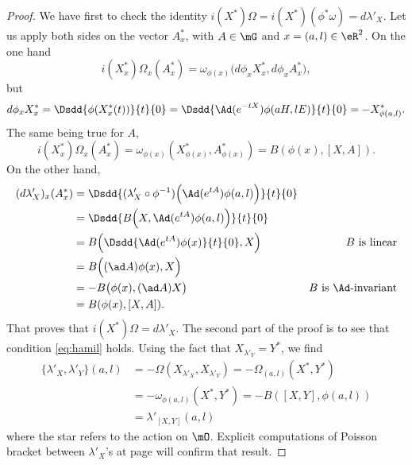 \begin{proof}
We have first to check the identity $i(X^*)\Omega=i(X^*)(\phi^*\omega)=d\lambda'_X$. Let us apply both sides on the vector $A^*_x$, with $A\in\mG$ and $x=(a,l)\in\eR^2$. On the one hand
\[
  i(X^*_x)\Omega_x(A^*_x)=\omega_{\phi(x)}\big(   d\phi_xX^*_x,d\phi_xA^*_x   \big),
\]
but  
\begin{equation}
  d\phi_xX^*_x=\Dsdd{\phi(X^*_x(t))}{t}{0}
              =\Dsdd{ \Ad(e^{-tX})\phi(aH,lE) }{t}{0}
	      =-X^*_{\phi(a,l)}.
\end{equation}
The same being true for $A$,
\[
  i(X^*_x)\Omega_x(A^*_x)=\omega_{\phi(x)}(X^*_{\phi(x)},A^*_{\phi(x)})=B(\phi(x),[X,A]).
\]
On the other hand,
\begin{equation}
\begin{aligned}
    (d\lambda'_X)_x(A^*_x)&=\Dsdd{ (\lambda'_X\circ\phi^{-1})\Big(   \Ad(e^{tA})\phi(a,l)   \Big) }{t}{0}\\
                         &=\Dsdd{  B\Big(X,\Ad(e^{tA})\phi(a,l) \Big)  }{t}{0} \\
			 &=B\Big(  \Dsdd{\Ad(e^{tA})\phi(x)}{t}{0},X   \Big)    &\text{$B$ is linear}\\
			 &=B\Big(  (\ad A)\phi(x),X   \Big)\\
			 &=-B\big(\phi(x),(\ad A)X\big) &\text{$B$ is $\Ad$-invariant}\\
			 &=B(\phi(x),[X,A]).
\end{aligned}
\end{equation}
That proves that $i(X^*)\Omega=d\lambda'_X$.  The second part of the proof is to see that condition \eqref{eq:hamil} holds.  Using the fact that $X_{\lambda'_Y}=Y^*$, we find
\[ 
\begin{split}
  \{ \lambda'_X,\lambda'_Y \}(a,l)&=-\Omega(X_{\lambda'_X},X_{\lambda'_Y})
		=-\Omega_{(a,l)}(X^*,Y^*)\\
		&=-\omega_{\phi(a,l)}(X^*,Y^*)
		=-B([X,Y],\phi(a,l))\\
		&=\lambda'_{[X,Y]}(a,l)
\end{split}
\]
where the star refers to the action on $\mO$. Explicit computations of Poisson bracket between $\lambda'_X$'s at page \pageref{pg:explic_com_lamb} will confirm that result.

\end{proof}

